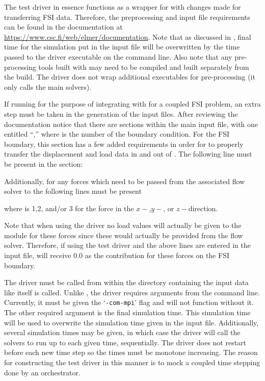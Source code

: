 
The test driver in essence functions as a wrapper for \elmer with changes made for transferring FSI data. Therefore, the preprocessing and input file requirements can be found in the \elmer documentation at \url{https://www.csc.fi/web/elmer/documentation}. Note that as discussed in , final time for the simulation put in the input file will be overwritten by the time passed to the driver executable on the command line. Also note that any pre-processing tools built with \elmer may need to be compiled and built separately from the \irprogram build. The driver does not wrap additional executables for pre-processing (it only calls the main \elmer solvers).

If running \irprogram for the purpose of integrating with \foam for a coupled FSI problem, an extra step must be taken in the generation of the input files. After reviewing the \elmer documentation notice that there are sections within the main input file, with one entitled ``,'' where \irfilename{\#} is the number of the boundary condition. For the FSI boundary, this section has a few added requirements in order for \irprogram to properly transfer the displacement and load data in and out of \elmer\!\!. The following line must be present in the section:


Additionally, for any forces which need to be passed from the associated flow solver to \elmer the following lines must be present


\tab {}
  
  where \irfilename{\#} is 1,2, and/or 3 for the force in the $x-$,$y-$, or $z-$direction.
  
 Note that when using the \irprogram driver no load values will actually be given to the module for these forces  since these would actually be provided from the flow solver. Therefore, if using the test driver and the above lines are entered in the input file, \elmer will receive 0.0 as the contribution for these forces on the FSI boundary.


The \irprogram driver must be called from within the directory containing the input data like \elmer itself is called. Unlike \elmer, the \irprogram driver requires arguments from the command line. Currently, it must be given the `\texttt{-com-mpi}' flag and will not function without it. The other required argument is the final simulation time. This simulation time will be used to overwrite the simulation time given in the \elmer input file. Additionally, several simulation times may be given, in which case the driver will call the \elmer solvers to run up to each given time, sequentially. The driver does not restart before each new time step so the times must be monotone increasing. The reason for constructing the test driver in this manner is to mock a coupled time stepping done by an orchestrator.

